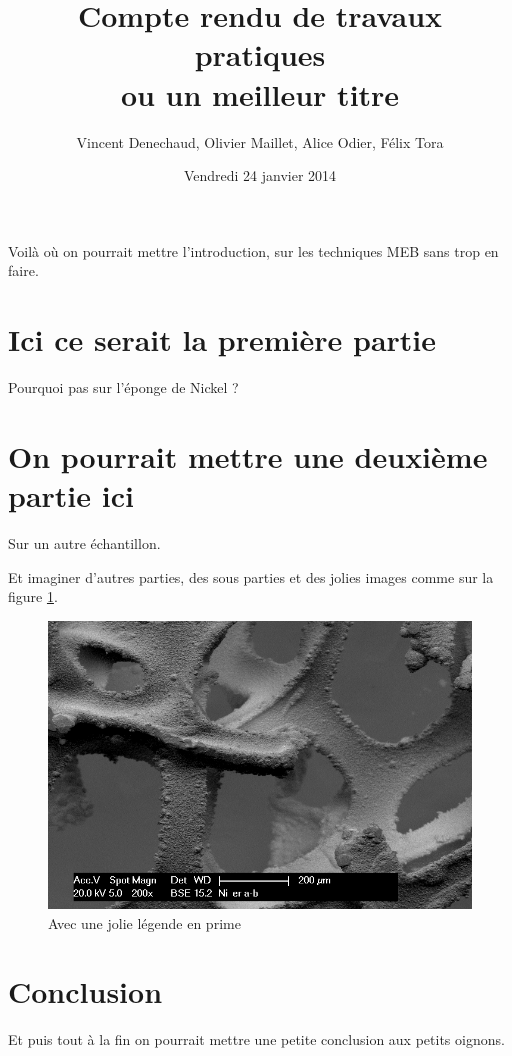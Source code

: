 \documentclass[a4paper,12pt]{article}
\title{Compte rendu de travaux pratiques\\ \small ou un meilleur titre}
\author{Vincent Denechaud, Olivier Maillet, Alice Odier, Félix Tora}
\date{Vendredi 24 janvier 2014}
\begin{document}
\maketitle

Voilà où on pourrait mettre l'introduction, sur les techniques MEB sans trop en faire.


\section{Ici ce serait la première partie}

Pourquoi pas sur l'éponge de Nickel ?

\section{On pourrait mettre une deuxième partie ici}

Sur un autre échantillon.

\vspace{5cm}

Et imaginer d'autres parties, des sous parties et des jolies images comme sur la figure \ref{fig:ni_er_amb}.

\begin{figure}
\centering
\includegraphics[width = 0.7 \textwidth]{images/ni_er_amb.png}
\caption{Avec une jolie légende en prime}
\label{fig:ni_er_amb}
\end{figure}

\section*{Conclusion}

Et puis tout à la fin on pourrait mettre une petite conclusion aux petits oignons.
\end{document}

